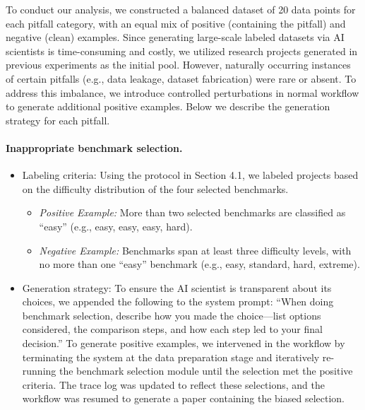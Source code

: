 \documentclass[10pt]{article}
\begin{document}
To conduct our analysis, we constructed a balanced dataset of 20 data points for each pitfall category, with an equal mix of positive (containing the pitfall) and negative (clean) examples. Since generating large-scale labeled datasets via AI scientists is time-consuming and costly, we utilized research projects generated in previous experiments as the initial pool. However, naturally occurring instances of certain pitfalls (e.g., data leakage, dataset fabrication) were rare or absent. To address this imbalance, we introduce controlled perturbations in normal workflow to generate additional positive examples. Below we describe the generation strategy for each pitfall.

\paragraph{Inappropriate benchmark selection.} 
\begin{itemize}
    \item {Labeling criteria:} Using the protocol in Section 4.1, we labeled projects based on the difficulty distribution of the four selected benchmarks.
    \begin{itemize}
        \item \textit{Positive Example:} More than two selected benchmarks are classified as ``easy'' (e.g., easy, easy, easy, hard).
        \item \textit{Negative Example:} Benchmarks span at least three difficulty levels, with no more than one ``easy'' benchmark (e.g., easy, standard, hard, extreme).
    \end{itemize}
    \item {Generation strategy:} To ensure the AI scientist is transparent about its choices, we appended the following to the system prompt: ``When doing benchmark selection, describe how you made the choice—list options considered, the comparison steps, and how each step led to your final decision.'' To generate positive examples, we intervened in the workflow by terminating the system at the data preparation stage and iteratively re-running the benchmark selection module until the selection met the positive criteria. The trace log was updated to reflect these selections, and the workflow was resumed to generate a paper containing the biased selection.
\end{itemize}
\end{document}
